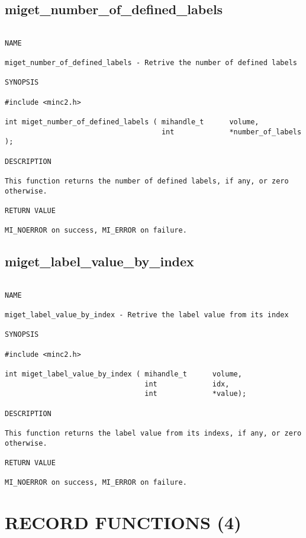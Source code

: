 \documentclass{article}
\begin{document}
\subsection{miget\_number\_of\_defined\_labels}
\begin{verbatim}

NAME

miget_number_of_defined_labels - Retrive the number of defined labels

SYNOPSIS

#include <minc2.h>

int miget_number_of_defined_labels ( mihandle_t      volume, 
                                     int             *number_of_labels );

DESCRIPTION

This function returns the number of defined labels, if any, or zero otherwise.

RETURN VALUE

MI_NOERROR on success, MI_ERROR on failure.
\end{verbatim}

\subsection{miget\_label\_value\_by\_index}
\begin{verbatim}

NAME

miget_label_value_by_index - Retrive the label value from its index

SYNOPSIS

#include <minc2.h>

int miget_label_value_by_index ( mihandle_t      volume, 
                                 int             idx,
                                 int             *value);

DESCRIPTION

This function returns the label value from its indexs, if any, or zero otherwise.

RETURN VALUE

MI_NOERROR on success, MI_ERROR on failure.
\end{verbatim}

\section{RECORD FUNCTIONS (4)}
\end{document}
